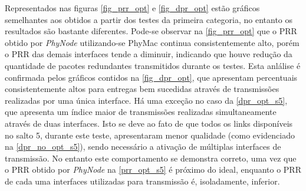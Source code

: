 \documentclass[
	12pt,				%
	openright,			%
	oneside,
	a4paper,			%
	english,			%
	french,				%
	spanish,			%
	brazil				%
	]{abntex2}
\begin{document}
Representados nas figuras \ref{fig_prr_opt} e \ref{fig_dpr_opt} estão gráficos semelhantes aos obtidos a partir dos testes da primeira categoria, no entanto os resultados são bastante diferentes. Pode-se observar na \autoref{fig_prr_opt} que o PRR obtido por \textit{PhyNode} utilizando-se PhyMac continua consistentemente alto, porém o PRR das demais interfaces tende a diminuir, indicando que houve redução da quantidade de pacotes redundantes transmitidos durante os testes. Esta anlálise é confirmada pelos gráficos contidos na \autoref{fig_dpr_opt}, que apresentam percentuais consistentemente altos para entregas bem sucedidas através de transmissões realizadas por uma única interface. Há uma exceção no caso da \autoref{dpr_opt_s5}, que apresenta um índice maior de transmissões realizadas simultaneamente através de duas interfaces. Isto se deve ao fato de que todos os links disponíveis no salto 5, durante este teste, apresentaram menor qualidade (como evidenciado na \autoref{dpr_no_opt_s5}), sendo necessário a ativação de múltiplas interfaces de transmissão. No entanto este comportamento se demonstra correto, uma vez que o PRR obtido por \textit{PhyNode} na \autoref{prr_opt_s5} é próximo do ideal, enquanto o PRR de cada uma interfaces utilizadas para transmissão é, isoladamente, inferior.
\end{document}
